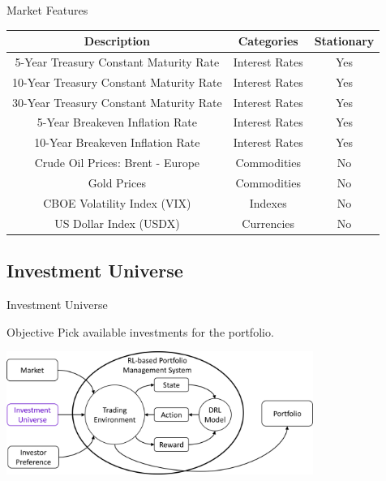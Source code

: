 \begin{frame}{Market Features}
\footnotesize
\begin{tabular}{|| c| c | c||}
\hline
Description & Categories & Stationary \\ \hline \hline
5-Year Treasury Constant Maturity Rate & Interest Rates  & Yes \\ \hline
10-Year Treasury Constant Maturity Rate & Interest Rates & Yes \\ \hline
30-Year Treasury Constant Maturity Rate & Interest Rates & Yes \\ \hline
5-Year Breakeven Inflation Rate & Interest Rates & Yes \\ \hline
10-Year Breakeven Inflation Rate & Interest Rates & Yes \\ \hline
Crude Oil Prices: Brent - Europe &  Commodities & No \\ \hline
Gold Prices &  Commodities & No \\ \hline
CBOE Volatility Index (VIX) &  Indexes & No \\ \hline
US Dollar Index (USDX) &  Currencies & No \\ \hline
\end{tabular}
\end{frame}



\newcommand\mynum[1]{{\renewcommand{\insertenumlabel}{#1}%
      \usebeamertemplate{enumerate item}}}



\subsection{Investment Universe}
\begin{frame}{Investment Universe}
    \begin{block}{Objective}
        Pick available investments for the portfolio.
    \end{block}


\centering
\includegraphics[width=10cm]{images/investment_universe.png}
\end{frame}

